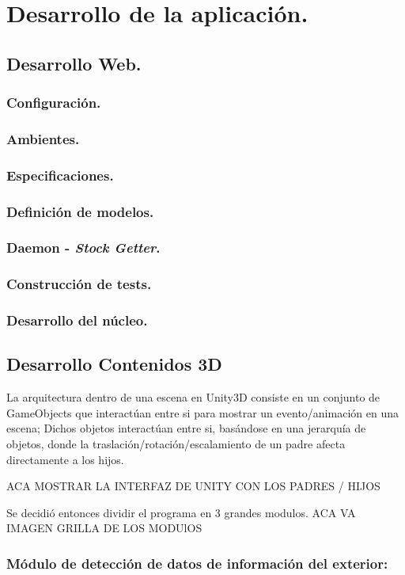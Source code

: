 \chapter{Desarrollo de la aplicación.}

\section{Desarrollo Web.}
\subsection{Configuración.}
\subsection{Ambientes.}
\subsection{Especificaciones.}
\subsection{Definición de modelos.}
\subsection{Daemon - \emph{Stock Getter}.}
\subsection{Construcción de tests.}
\subsection{Desarrollo del núcleo.}


\section{Desarrollo Contenidos 3D}
La arquitectura dentro de una escena en Unity3D consiste en un conjunto de GameObjects que interactúan entre si para mostrar un evento/animación en una escena; Dichos objetos interactúan entre si, basándose en una jerarquía de objetos, donde la traslación/rotación/escalamiento de un padre afecta directamente a los hijos.

ACA MOSTRAR LA INTERFAZ DE UNITY CON LOS PADRES / HIJOS

Se decidió entonces dividir el programa en 3 grandes modulos.
ACA VA IMAGEN GRILLA DE LOS MODUlOS
\subsection{Módulo de detección de datos de información del exterior:}

